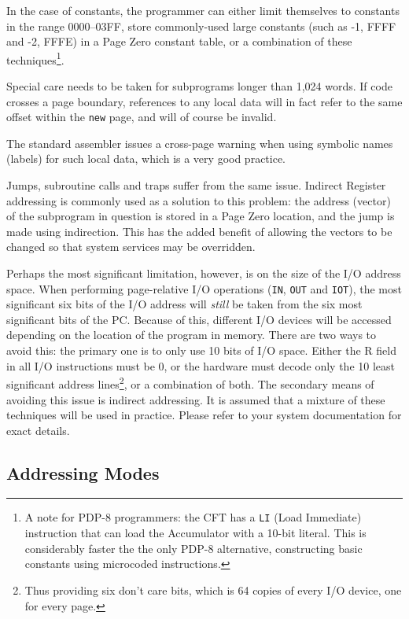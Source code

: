 \documentclass[11pt,a4paper,twocolumns]{article}
\newcommand\hex[1]{\textsf{#1}}
\newcommand\register[1]{\textsf{#1}}
\newcommand\PC{\register{PC}}
\begin{document}
In the case of constants, the programmer can either limit themselves
to constants in the range \hex{0000}–\hex{03FF}, store commonly-used
large constants (such as -1, \hex{FFFF} and -2, \hex{FFFE}) in a Page
Zero constant table, or a combination of these techniques\footnote{A
  note for PDP-8 programmers: the CFT has a {\tt LI} (Load Immediate)
  instruction that can load the Accumulator with a 10-bit
  literal. This is considerably faster the the only PDP-8 alternative,
  constructing basic constants using microcoded instructions.}.

Special care needs to be taken for subprograms longer than 1,024
words. If code crosses a page boundary, references to any local data
will in fact refer to the same offset within the {\tt new\/} page, and
will of course be invalid.

The standard assembler issues a cross-page warning when using symbolic
names (labels) for such local data, which is a very good practice.

Jumps, subroutine calls and traps suffer from the same issue. Indirect
Register addressing is commonly used as a solution to this problem:
the address (vector) of the subprogram in question is stored in a Page
Zero location, and the jump is made using indirection. This has the
added benefit of allowing the vectors to be changed so that system
services may be overridden.

Perhaps the most significant limitation, however, is on the size of
the I/O address space. When performing page-relative I/O operations
({\tt IN}, {\tt OUT} and {\tt IOT}), the most significant six bits of
the I/O address will {\em still\/} be taken from the six most
significant bits of the \PC. Because of this, different I/O devices
will be accessed depending on the location of the program in
memory. There are two ways to avoid this: the primary one is to only
use 10 bits of I/O space. Either the R field in all I/O instructions
must be 0, or the hardware must decode only the 10 least significant
address lines\footnote{Thus providing six don't care bits, which is 64
  copies of every I/O device, one for every page.}, or a combination
of both. The secondary means of avoiding this issue is indirect
addressing. It is assumed that a mixture of these techniques will be
used in practice. Please refer to your system documentation for exact
details.

\subsection{Addressing Modes}
\end{document}
